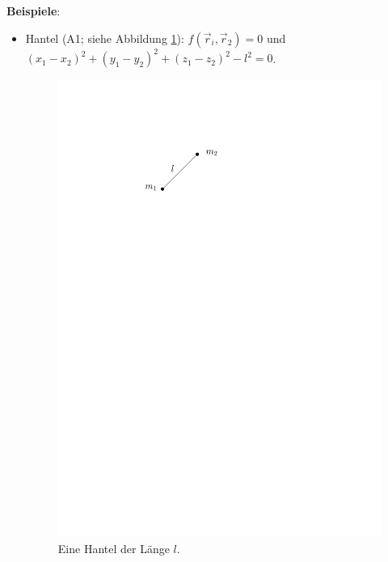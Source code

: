 \textbf{Beispiele}:
\begin{itemize}
	\item Hantel (A1; siehe Abbildung \ref{fig:ch1_hantel}): $f(\vec{r}_i, \vec{r}_2) = 0$ und $(x_1 - x_2)^2 + (y_1 - y_2)^2 + (z_1 - z_2)^2 - l^2 = 0$.
	\begin{figure}
		\centering
		\includegraphics{figures/ch1/hantel}
		\caption{Eine Hantel der Länge $l$.}
		\label{fig:ch1_hantel}
	\end{figure}
	

\end{itemize}
